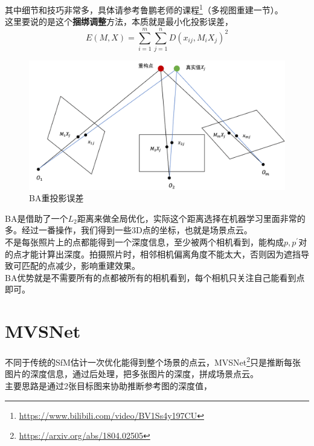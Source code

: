 	其中细节和技巧非常多，具体请参考鲁鹏老师的课程\footnote{\url{https://www.bilibili.com/video/BV1Ss4y197CU}}（多视图重建一节）。\\

	这里要说的是这个\textbf{捆绑调整}方法，本质就是最小化投影误差，
	$$
		E(M,X) = \sum_{i=1}^m \sum_{j=1}^n D\left(x_{ij}, M_iX_j\right)^2
	$$

	\begin{figure}[H]
		\begin{center}
			\includegraphics[width=\textwidth]{images/ba.png}
		\end{center}
		\caption{BA重投影误差}
	\end{figure}

	BA是借助了一个$L_2$距离来做全局优化，实际这个距离选择在机器学习里面非常的多。经过一番操作，我们得到一些3D点的坐标，也就是场景点云。\\

	不是每张照片上的点都能得到一个深度信息，至少被两个相机看到，能构成$p,p^{\prime}$对的点才能计算出深度。拍摄照片时，相邻相机偏离角度不能太大，否则因为遮挡导致可匹配的点减少，影响重建效果。\\

	BA优势就是不需要所有的点都被所有的相机看到，每个相机只关注自己能看到点即可。

\section{MVSNet}

	不同于传统的SfM估计一次优化能得到整个场景的点云，MVSNet\footnote{\url{https://arxiv.org/abs/1804.02505}}只是推断每张图片的深度信息，通过后处理，把多张图片的深度，拼成场景点云。\\

	主要思路是通过2张目标图来协助推断参考图的深度值，

